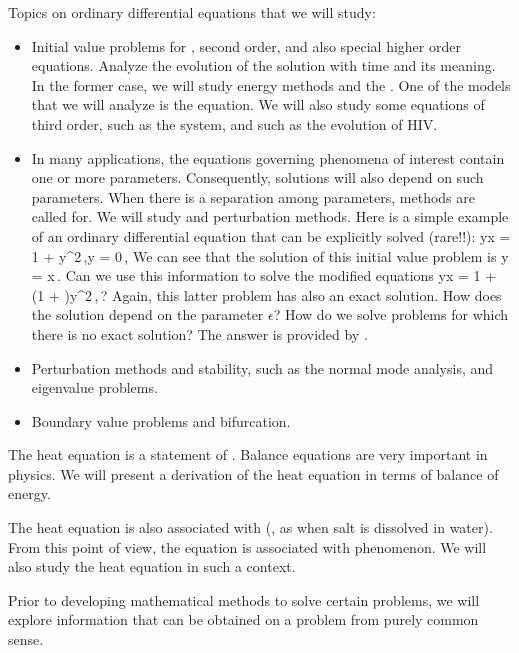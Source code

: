 Topics on ordinary differential equations that we will study:
\begin{itemize}
\item Initial value problems for , second order, and also special higher order equations. Analyze the evolution of the solution with time and its meaning. In the former case, we will study energy methods and the . One of the models that we will analyze is the  equation. We will also study some equations of third order, such as the  system, and  such as the evolution of HIV.
%
\item In many applications, the equations governing phenomena of interest contain one or more parameters. Consequently, solutions will also depend on such parameters. When there is a  separation among parameters,  methods are called for. We will study  and  perturbation methods. Here is a simple example of an ordinary differential equation that can be explicitly solved (rare!!):
\beq
\xod yx = 1 + y^2\,,\qquad y = 0\,,
\eeq
We can see that the solution of this initial value problem is
\beq
y = \tan\vat x\,.
\eeq
Can we use this information to solve the modified equations
\beq
\xod yx = 1 + (1 + \epsilon)y^2\,,\qquad \magn\epsilon{}\,?
\eeq
Again, this latter problem has also an exact solution. How does the solution depend on the parameter $\epsilon$? How do we solve problems for which there is no exact solution? The answer is provided by .
%
\item Perturbation methods and stability, such as the normal mode analysis, and eigenvalue problems.
%
\item Boundary value problems and bifurcation.
%
\end{itemize}

The heat equation is a statement of . Balance equations are very important in physics. We will present a derivation of the heat equation in terms of balance of energy.

The heat equation is also associated with  (\eg, as when salt is dissolved in water). From this point of view, the equation is associated with  phenomenon. We will also study the heat equation in such a context.

Prior to developing mathematical methods to solve certain problems, we will explore information that can be obtained on a problem from purely common sense.


